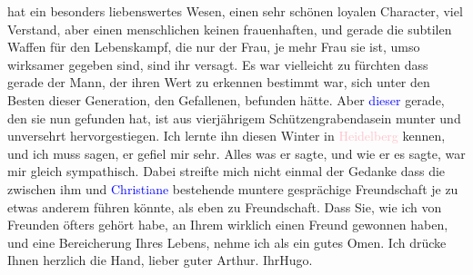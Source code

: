                hat ein besonders liebenswertes Wesen, einen sehr schönen loyalen Character, viel
               Verstand, aber einen menschlichen keinen frauenhaften, und gerade die subtilen Waffen
               für den Lebenskampf, die nur der Frau, je mehr Frau sie ist, umso wirksamer gegeben
               sind, sind ihr versagt. Es war vielleicht zu fürchten dass gerade der Mann, der ihren
               Wert zu erkennen bestimmt war, sich unter den Besten dieser Generation, den
               Gefallenen, befunden hätte. Aber \textcolor{blue}{dieser}{} gerade, den sie nun gefunden hat, ist aus vierjährigem
               Schützengrabendasein munter und unversehrt hervorgestiegen.\pend
           \pstart
           Ich lernte ihn diesen Winter in \textcolor{pink}{Heidelberg}{}\ledrightnote{\textcolor{pink}{Heidelberg}} kennen, und ich muss sagen, er gefiel mir sehr. Alles was er
               sagte, und wie er es sagte, war mir gleich sympathisch. Dabei streifte mich nicht
               einmal der Gedanke dass die {\pb}zwischen ihm und \textcolor{blue}{Christiane}{}\ledrightnote{\textcolor{blue}{Christiane von Hofmannsthal}} bestehende muntere
               gesprächige Freundschaft je zu etwas anderem führen könnte, als eben zu
               Freundschaft.\pend
           \pstart
           Dass Sie, wie ich von Freunden öfters gehört habe, an Ihrem \label{K_L02503_4v}\label{K_L02503_4h} wirklich einen Freund gewonnen
               haben, und eine Bereicherung Ihres Lebens, nehme ich als ein gutes Omen.\pend
           \pstart
           Ich drücke Ihnen herzlich die Hand, lieber guter Arthur.\pend
           \pstart Ihr\spacefill\mbox{Hugo.}\pend{}\endnumbering{}  
      